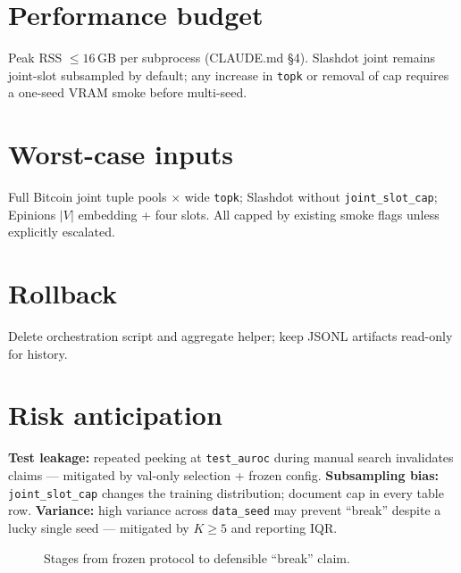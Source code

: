 \documentclass{article}
\begin{document}
\section*{Performance budget}
Peak RSS $\leq 16$\,GB per subprocess (CLAUDE.md \S4). Slashdot joint remains
joint-slot subsampled by default; any increase in \texttt{topk} or removal of
cap requires a one-seed VRAM smoke before multi-seed.

\section*{Worst-case inputs}
Full Bitcoin joint tuple pools $\times$ wide \texttt{topk}; Slashdot without
\texttt{joint\_slot\_cap}; Epinions $|V|$ embedding + four slots. All capped by
existing smoke flags unless explicitly escalated.

\section*{Rollback}
Delete orchestration script and aggregate helper; keep JSONL artifacts read-only
for history.

\section*{Risk anticipation}
\textbf{Test leakage:} repeated peeking at \texttt{test\_auroc} during manual
search invalidates claims --- mitigated by val-only selection + frozen config.
\textbf{Subsampling bias:} \texttt{joint\_slot\_cap} changes the training
distribution; document cap in every table row. \textbf{Variance:} high
variance across \texttt{data\_seed} may prevent ``break'' despite a lucky
single seed --- mitigated by $K \geq 5$ and reporting IQR.

\begin{figure}[h]
\centering

\caption{Stages from frozen protocol to defensible ``break'' claim.}
\end{figure}
\end{document}

